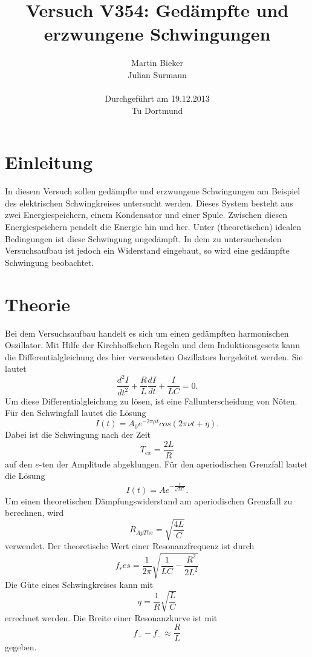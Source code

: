 \documentclass[11pt,ngerman,a4paper]{article}
\title{\textbf{Versuch V354: Gedämpfte und erzwungene Schwingungen}}
\author{Martin Bieker\\
		Julian Surmann\\
		\\
		Durchgef\"{u}hrt am 19.12.2013\\
		Tu Dortmund}
\date{}
\begin{document}
\renewcommand\tablename{Tabelle}
\renewcommand\figurename{Abbildung}
\maketitle
\thispagestyle{empty}
\newpage
\clearpage
\setcounter{page}{1}


\section{Einleitung}
In diesem Versuch sollen gedämpfte und erzwungene Schwingungen am Beispiel des elektrischen Schwingkreises untersucht werden. Dieses System besteht aus zwei Energiespeichern, einem Kondensator und einer Spule. Zwischen diesen Energiespeichern pendelt die Energie hin und her. Unter (theoretischen) idealen Bedingungen ist diese Schwingung ungedämpft. In dem zu untersuchenden Versuchsaufbau ist jedoch ein Widerstand eingebaut, so wird eine gedämpfte Schwingung beobachtet.
\section{Theorie}
Bei dem Versuchsaufbau handelt es sich um einen gedämpften harmonischen Oszillator. Mit Hilfe der Kirchhoffschen Regeln und dem Induktionsgesetz kann die Differentialgleichung des hier verwendeten Oszillators hergeleitet werden. Sie lautet
\begin{equation}
\label{DGL}
\frac{d^2 I}{d t^2} + \frac{R}{L} \frac{d I}{d t} + \frac{I}{LC} = 0.
\end{equation}
Um diese Differentialgleichung zu lösen, ist eine Fallunterscheidung von Nöten.\newline
Für den Schwingfall lautet die Lösung
\begin{equation}
\label{LSG1}
I(t) = A_0 e^{-2 \pi \mu t} cos (2 \pi \nu t + \eta).
\end{equation}
Dabei ist die Schwingung nach der Zeit
\begin{equation}
\label{Tex}
T_{ex} = \frac{2L}{R}
\end{equation}
auf den $e$-ten der Amplitude abgeklungen.
Für den aperiodischen Grenzfall lautet die Lösung
\begin{equation}
\label{LSG2}
I(t) = A e^{- \frac{t}{\sqrt{LC}}}.
\end{equation}
Um einen theoretischen Dämpfungswiderstand am aperiodischen Grenzfall zu berechnen, wird
\begin{equation}
\label{aper}
R_{ApThe} = \sqrt{\frac{4L}{C}}
\end{equation} verwendet.
Der theoretische Wert einer Resonanzfrequenz ist durch
\begin{equation}
f_res = \frac1{2\pi} \sqrt{\frac{1}{LC}-\frac{R^2}{2L^2}}
\label{frequenz}
\end{equation}
Die Güte eines Schwingkreises kann mit
\begin{equation}
q = \frac{1}{R} \sqrt{\frac{L}{C}}
\label{gute}
\end{equation}
errechnet werden.
Die Breite einer Resonanzkurve ist mit
\begin{equation}
f_+ - f_- \approx \frac{R}{L}
\label{breite}
\end{equation}
gegeben.
\end{document}

